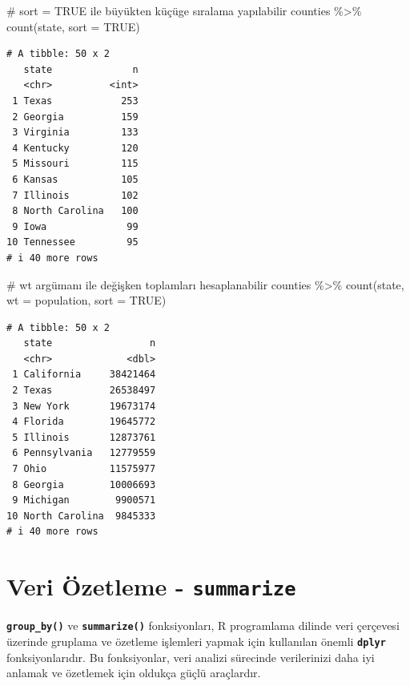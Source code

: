 \documentclass[
  letterpaper,
  DIV=11,
  numbers=noendperiod]{scrreprt}
\newenvironment{Shaded}{\begin{snugshade}}{\end{snugshade}}
\newcommand{\AttributeTok}[1]{\textcolor[rgb]{0.40,0.45,0.13}{#1}}
\newcommand{\CommentTok}[1]{\textcolor[rgb]{0.37,0.37,0.37}{#1}}
\newcommand{\ConstantTok}[1]{\textcolor[rgb]{0.56,0.35,0.01}{#1}}
\newcommand{\FunctionTok}[1]{\textcolor[rgb]{0.28,0.35,0.67}{#1}}
\newcommand{\NormalTok}[1]{\textcolor[rgb]{0.00,0.23,0.31}{#1}}
\newcommand{\SpecialCharTok}[1]{\textcolor[rgb]{0.37,0.37,0.37}{#1}}
\begin{document}
\begin{Shaded}
\begin{Highlighting}[]
\CommentTok{\# sort = TRUE ile büyükten küçüge sıralama yapılabilir}
\NormalTok{counties }\SpecialCharTok{\%\textgreater{}\%}
\FunctionTok{count}\NormalTok{(state, }\AttributeTok{sort =} \ConstantTok{TRUE}\NormalTok{)}
\end{Highlighting}
\end{Shaded}

\begin{verbatim}
# A tibble: 50 x 2
   state              n
   <chr>          <int>
 1 Texas            253
 2 Georgia          159
 3 Virginia         133
 4 Kentucky         120
 5 Missouri         115
 6 Kansas           105
 7 Illinois         102
 8 North Carolina   100
 9 Iowa              99
10 Tennessee         95
# i 40 more rows
\end{verbatim}

\begin{Shaded}
\begin{Highlighting}[]
\CommentTok{\# wt argümanı ile değişken toplamları hesaplanabilir}
\NormalTok{counties }\SpecialCharTok{\%\textgreater{}\%}
\FunctionTok{count}\NormalTok{(state, }\AttributeTok{wt =}\NormalTok{ population, }\AttributeTok{sort =} \ConstantTok{TRUE}\NormalTok{)}
\end{Highlighting}
\end{Shaded}

\begin{verbatim}
# A tibble: 50 x 2
   state                 n
   <chr>             <dbl>
 1 California     38421464
 2 Texas          26538497
 3 New York       19673174
 4 Florida        19645772
 5 Illinois       12873761
 6 Pennsylvania   12779559
 7 Ohio           11575977
 8 Georgia        10006693
 9 Michigan        9900571
10 North Carolina  9845333
# i 40 more rows
\end{verbatim}

\section*{\texorpdfstring{Veri Özetleme -
\texttt{summarize}}{Veri Özetleme - summarize}}\label{veri-uxf6zetleme---summarize}


\textbf{\texttt{group\_by()}} ve \textbf{\texttt{summarize()}}
fonksiyonları, R programlama dilinde veri çerçevesi üzerinde gruplama ve
özetleme işlemleri yapmak için kullanılan önemli \textbf{\texttt{dplyr}}
fonksiyonlarıdır. Bu fonksiyonlar, veri analizi sürecinde verilerinizi
daha iyi anlamak ve özetlemek için oldukça güçlü araçlardır.
\end{document}
